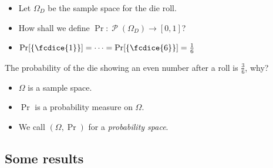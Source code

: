 \documentclass{beamer}
\DeclareMathOperator{\powerset}{\mathcal{P}}
\begin{document}
\begin{frame}
  \begin{example}
    \begin{itemize}
      \item Let \(\Omega_D\) be the sample space for the die roll.
      \item How shall we define \(\Pr\colon \powerset(\Omega_D)\to [0, 1]\)?

        \pause{}

      \item \(\Pr[\{\fcdice{1}\}] = \cdots = \Pr[\{\fcdice{6}\}] 
          = \frac{1}{6}\)
    \end{itemize}
  \end{example}

  \pause{}

  \begin{exercise}
    The probability of the die showing an even number after a roll is 
    \(\frac{3}{6}\), why?
  \end{exercise}
\end{frame}

\begin{frame}
  \begin{definition}
    \begin{itemize}
      \item \(\Omega\) is a sample space.
      \item \(\Pr\) is a probability measure on \(\Omega\).

        \pause{}

      \item We call \((\Omega, \Pr)\) for a \emph{probability space}.
    \end{itemize}
  \end{definition}
\end{frame}

\subsection{Some results}
\end{document}
